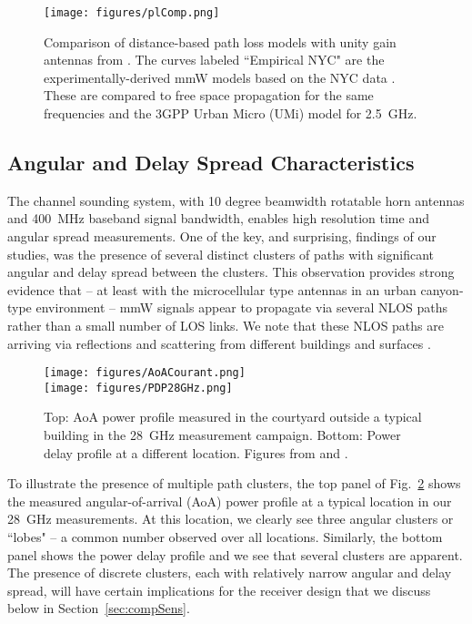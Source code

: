 \documentclass[journal]{IEEEtran}
\begin{document}
\begin{figure}
    \centering
    \texttt{[image: figures/plComp.png]}
    \caption{Comparison of distance-based path loss models with unity gain antennas
    from \cite{AkLiuRanRapEr:13-arxiv}.     The curves labeled ``Empirical NYC"
    are the experimentally-derived mmW models based on the NYC data
     \cite{rappaportmillimeter}.
    These are compared to free space propagation for the same frequencies
    and the 3GPP Urban Micro (UMi) model \cite{3GPP36.814} for 2.5~GHz. }
    \label{fig:plComp}
\end{figure}

\subsection{Angular and Delay Spread Characteristics} \label{sec:chanMeasAng}

The channel sounding system, with 10 degree beamwidth rotatable horn antennas and
400~MHz baseband signal bandwidth, enables high resolution time and angular spread
measurements.  One of the key, and surprising, findings of our studies,
was the presence of several distinct clusters of paths
with significant angular and delay spread between the clusters.
This observation provides strong evidence that
-- at least with the microcellular type antennas in an urban canyon-type
 environment -- mmW signals
appear to propagate via several NLOS paths rather than a small number of LOS links.
We note that
these NLOS paths are arriving via reflections and scattering from
different buildings and surfaces
\cite{rappaportmillimeter,ben2011millimeter,Rappaport:12-28G,Rappaport:28NYCPenetrationLoss,Samimi:AoAD,Nie72G-PIMRC:13,Rappaport:13-BBmmW,Rappaport38:12}.

\begin{figure}
\begin{center}
    \texttt{[image: figures/AoACourant.png]} \\
    \vspace{0.5cm}
    \texttt{[image: figures/PDP28GHz.png]}
\end{center}
\caption{Top:  AoA power profile measured in the courtyard
outside a typical building in the 28~GHz measurement campaign.
Bottom:  Power delay profile at a different location.
Figures from \cite{Samimi:AoAD} and \cite{Sun-Beam:13}.
}
\label{fig:AoADelay}
\end{figure}


To illustrate the presence of multiple path clusters,
the top panel of Fig.~\ref{fig:AoADelay} shows the measured
angular-of-arrival (AoA) power profile at a typical location in our 28~GHz measurements.
At this location, we clearly see three angular clusters or ``lobes"
\cite{Samimi:AoAD} -- a common number observed over all locations.
Similarly, the bottom panel shows the power delay profile and we see that
several clusters are apparent.
The presence of discrete clusters, each with relatively narrow angular and delay spread,
will have certain implications for the receiver design that we discuss below in
Section~\ref{sec:compSens}.
\end{document}
